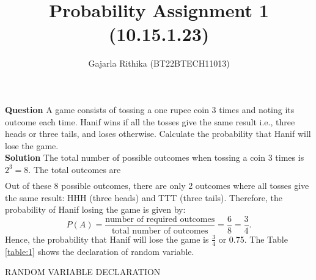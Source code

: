 \documentclass[12pt,twocolumn,notitlepage]{article}
\title{Probability Assignment 1 (10.15.1.23)}
\author{Gajarla Rithika (BT22BTECH11013)}
\date{}
\begin{document}
\maketitle
\textbf{Question}
A game consists of tossing a one rupee coin 3 times and noting its outcome each time. Hanif wins if all the tosses give the same result i.e., three heads or three tails, and loses otherwise. Calculate the probability that Hanif will lose the game.\\

\textbf{Solution}
The total number of possible outcomes when tossing a coin 3 times is $2^3 = 8$. The total outcomes are
\begin{align}
        [
\{ HHH, HHT, HTH, THH, HTT, THT, TTH, TTT \}
]
\end{align}
Out of these 8 possible outcomes, there are only 2 outcomes where all tosses give the same result: HHH (three heads) and TTT (three tails).
Therefore, the probability of Hanif losing the game is given by:
\begin{equation*}
    P(A) = \frac{\text{number of required outcomes}}{\text{total number of outcomes}} = \frac{6}{8} = \frac{3}{4}.
\end{equation*}
Hence, the probability that Hanif will lose the game is $\frac{3}{4}$ or 0.75.
 The Table \ref{table:1} shows the declaration of random variable.\\
  \setlength{\tabcolsep}{18pt}
 \renewcommand{\arraystretch}{2.15}
 \begin{table}[hbp] 
\centering
\caption{RANDOM VARIABLE DECLARATION}
\label{table:1}

\end{table}
\end{document}
